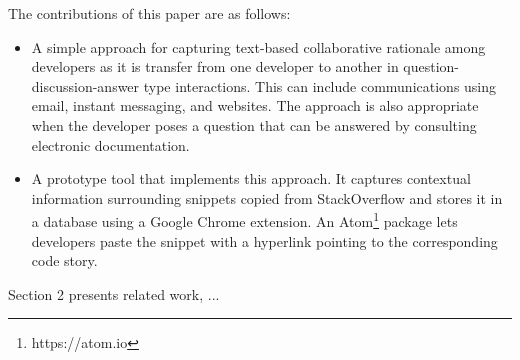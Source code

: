 \documentclass[../manifest.tex]{subfiles}
\begin{document}
The contributions of this paper are as follows:
\begin{itemize}
  \item A simple approach for capturing text-based collaborative rationale among
  developers as it is transfer from one developer to another in question-discussion-answer
  type interactions. This can include communications using email, instant messaging, and
  websites. The approach is also appropriate when the developer poses a question
  that can be answered by consulting electronic documentation.
  \item A prototype tool that implements this approach. It captures contextual
  information surrounding snippets copied from StackOverflow and stores it in a
  database using a Google Chrome extension. An Atom\footnote{https://atom.io}
  package lets developers paste the snippet with a hyperlink pointing to the
  corresponding code story.
\end{itemize}

Section 2 presents related work, ...
\end{document}
